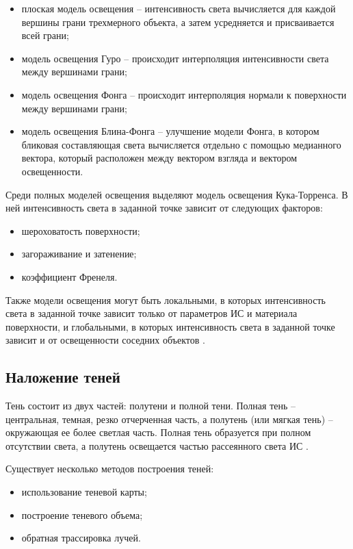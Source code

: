 \begin{itemize}
	\item плоская модель освещения -- интенсивность света вычисляется для каждой вершины грани трехмерного объекта, а затем усредняется и присваивается всей грани;
	\item модель освещения Гуро -- происходит интерполяция интенсивности света между вершинами грани;
	\item модель освещения Фонга -- происходит интерполяция нормали к поверхности между вершинами грани;
	\item модель освещения Блина-Фонга -- улучшение модели Фонга, в котором бликовая составляющая света вычисляется отдельно с помощью медианного вектора, который расположен между вектором взгляда и вектором освещенности.
\end{itemize}

Среди полных моделей освещения выделяют модель освещения Кука-Торренса. В ней интенсивность света в заданной точке зависит от следующих факторов:

\begin{itemize}
	\item шероховатость поверхности;
	\item загораживание и затенение;
	\item коэффициент Френеля.
\end{itemize}

Также модели освещения могут быть локальными, в которых интенсивность света в заданной точке зависит только от параметров ИС и материала поверхности, и глобальными, в которых интенсивность света в заданной точке зависит и от освещенности соседних объектов \cite{rogers}.

\subsection{Наложение теней}

Тень состоит из двух частей: полутени и полной тени. Полная тень -- центральная, темная, резко отчерченная часть, а полутень (или мягкая тень) -- окружающая ее более светлая часть. Полная тень образуется при полном отсутствии света, а полутень освещается частью рассеянного света ИС \cite{rogers}.

Существует несколько методов построения теней:

\begin{itemize}
	\item использование теневой карты;
	\item построение теневого объема;
	\item обратная трассировка лучей.
\end{itemize}

